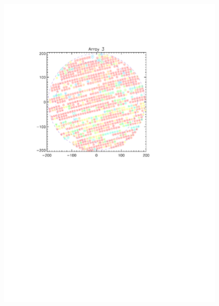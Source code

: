 \begin{figure}[p]
\begin{center}
\includegraphics[scale=0.1]{Figures/A3_fwhm_color_count.pdf}

\end{center}
\end{figure}
